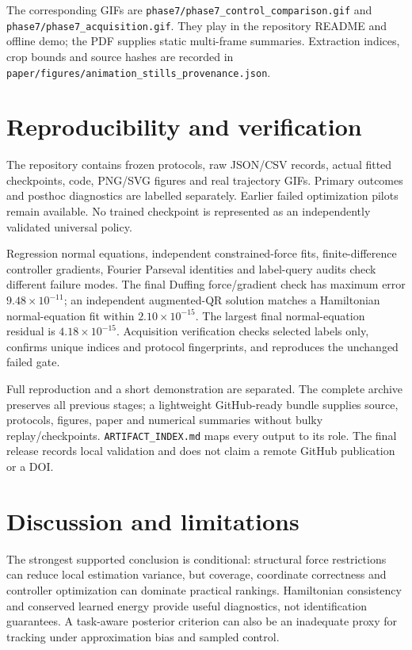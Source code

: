 \documentclass[
  10pt,
]{article}
\begin{document}
The corresponding GIFs are
\texttt{phase7/phase7\_control\_comparison.gif} and
\texttt{phase7/phase7\_acquisition.gif}. They play in the repository
README and offline demo; the PDF supplies static multi-frame summaries.
Extraction indices, crop bounds and source hashes are recorded in
\texttt{paper/figures/animation\_stills\_provenance.json}.

\hypertarget{reproducibility-and-verification}{%
\section{Reproducibility and
verification}\label{reproducibility-and-verification}}

The repository contains frozen protocols, raw JSON/CSV records, actual
fitted checkpoints, code, PNG/SVG figures and real trajectory GIFs.
Primary outcomes and posthoc diagnostics are labelled separately.
Earlier failed optimization pilots remain available. No trained
checkpoint is represented as an independently validated universal
policy.

Regression normal equations, independent constrained-force fits,
finite-difference controller gradients, Fourier Parseval identities and
label-query audits check different failure modes. The final Duffing
force/gradient check has maximum error \(9.48\times10^{-11}\); an
independent augmented-QR solution matches a Hamiltonian normal-equation
fit within \(2.10\times10^{-15}\). The largest final normal-equation
residual is \(4.18\times10^{-15}\). Acquisition verification checks
selected labels only, confirms unique indices and protocol fingerprints,
and reproduces the unchanged failed gate.

Full reproduction and a short demonstration are separated. The complete
archive preserves all previous stages; a lightweight GitHub-ready bundle
supplies source, protocols, figures, paper and numerical summaries
without bulky replay/checkpoints. \texttt{ARTIFACT\_INDEX.md} maps every
output to its role. The final release records local validation and does
not claim a remote GitHub publication or a DOI.

\hypertarget{discussion-and-limitations}{%
\section{Discussion and limitations}\label{discussion-and-limitations}}

The strongest supported conclusion is conditional: structural force
restrictions can reduce local estimation variance, but coverage,
coordinate correctness and controller optimization can dominate
practical rankings. Hamiltonian consistency and conserved learned energy
provide useful diagnostics, not identification guarantees. A task-aware
posterior criterion can also be an inadequate proxy for tracking under
approximation bias and sampled control.
\end{document}
